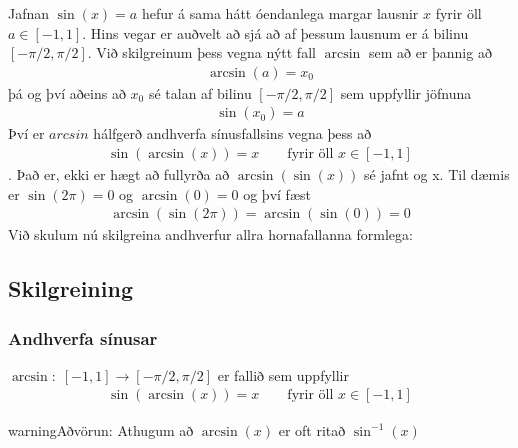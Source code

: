 \documentclass[a4paper,10pt,icelandic]{sphinxmanual}
\begin{document}
Jafnan \(\sin(x) = a\) hefur á sama hátt óendanlega margar lausnir \(x\) fyrir öll \(a \in [−1, 1]\).
Hins vegar er auðvelt að sjá að  af þessum lausnum er á bilinu \([−\pi/2, \pi/2]\).
Við skilgreinum þess vegna nýtt fall \(\arcsin\) sem að er þannig að
\begin{equation*}
\begin{split}\arcsin(a) = x_0\end{split}
\end{equation*}
þá og því aðeins að \(x_0\) sé talan af bilinu \([−\pi/2, \pi/2]\) sem uppfyllir jöfnuna
\begin{equation*}
\begin{split}\sin(x_0) = a\end{split}
\end{equation*}
Því er \(arcsin\) hálfgerð andhverfa sínusfallsins vegna þess að
\begin{equation*}
\begin{split}\sin(\arcsin(x)) = x \qquad \text{fyrir öll } x \in [−1, 1]\end{split}
\end{equation*}
.
Það er, ekki er hægt að fullyrða að \(\arcsin(\sin(x))\) sé jafnt og x.
Til dæmis er \(\sin(2\pi) = 0\) og \(\arcsin(0) = 0\) og því fæst
\begin{equation*}
\begin{split}\arcsin(\sin(2\pi)) = \arcsin(\sin(0)) = 0\end{split}
\end{equation*}
Við skulum nú skilgreina andhverfur allra hornafallanna formlega:


\subsection{Skilgreining}
\label{\detokenize{Kafli07:id2}}

\subsubsection{Andhverfa sínusar}
\label{\detokenize{Kafli07:andhverfa-sinusar}}
\(\arcsin: \; [-1,1] \rightarrow [−\pi/2, \pi/2]\) er fallið sem uppfyllir
\begin{equation*}
\begin{split}\sin(\arcsin(x)) = x \qquad \text{fyrir öll  } x \in [−1, 1]\end{split}
\end{equation*}
\begin{sphinxadmonition}{warning}{Aðvörun:}
Athugum að \(\arcsin(x)\) er oft ritað \(\sin^{-1}(x)\)
\end{sphinxadmonition}
\end{document}
